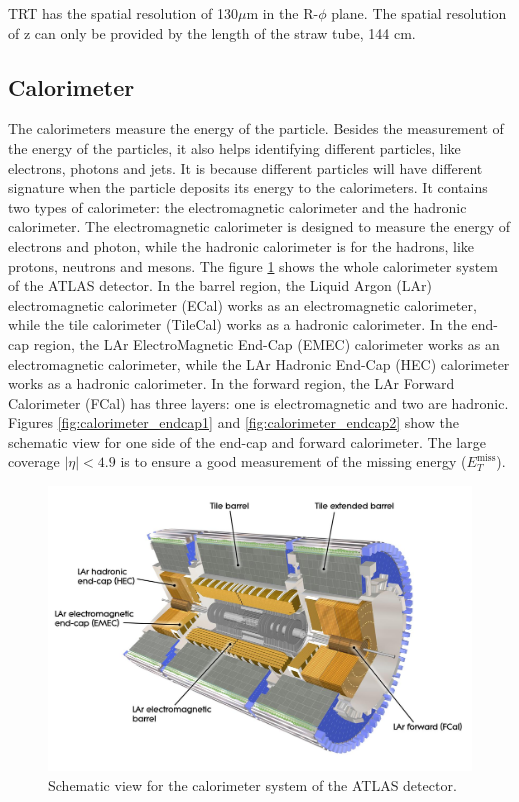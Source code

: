 TRT has the spatial resolution of 130$\mu$m in the R-$\phi$ plane.
The spatial resolution of z can only be provided by the length of the straw tube, 144 cm.

\subsection{Calorimeter}
The calorimeters measure the energy of the particle.
Besides the measurement of the energy of the particles, it also helps identifying different particles, like electrons, photons and jets.
It is because different particles will have different signature when the particle deposits its energy to the calorimeters.
It contains two types of calorimeter: the electromagnetic calorimeter and the hadronic calorimeter.
The electromagnetic calorimeter is designed to measure the energy of electrons and photon, while the hadronic calorimeter is for the hadrons, like protons, neutrons and mesons.
The figure \ref{fig:calorimeter_whole} shows the whole calorimeter system of the ATLAS detector.
In the barrel region, the Liquid Argon (LAr) electromagnetic calorimeter (ECal) works as an electromagnetic calorimeter, while the tile calorimeter (TileCal) works as a hadronic calorimeter.
In the end-cap region, the LAr ElectroMagnetic End-Cap (EMEC) calorimeter works as an electromagnetic calorimeter, while the LAr Hadronic End-Cap (HEC) calorimeter works as a hadronic calorimeter.
In the forward region, the LAr Forward Calorimeter (FCal) has three layers: one is electromagnetic and two are hadronic.
Figures \ref{fig:calorimeter_endcap1} and \ref{fig:calorimeter_endcap2} show the schematic view for one side of the end-cap and forward calorimeter.
The large coverage $|\eta| < 4.9$ is to ensure a good measurement of the missing energy ($E_T^{\text{miss}}$).

\begin{figure}
\centering
\includegraphics[width=\textwidth]{data/photo/detector/calorimeter_whole.jpg}
\caption{Schematic view for the calorimeter system of the ATLAS detector. \cite{calorimeter_whole}}
\label{fig:calorimeter_whole}
\end{figure}

